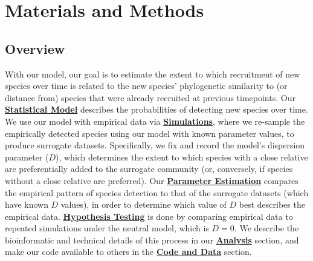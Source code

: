 \documentclass{article}
\begin{document}
\section{Materials and Methods}

\subsection{Overview} \label{sec:overview}
With our model, our goal is to estimate the extent to which recruitment of new species over time is related to the new species' phylogenetic similarity to (or distance from) species that were already recruited at previous timepoints. Our \hyperref[sec:statisticalModel]{\textbf{Statistical Model}} describes the probabilities of detecting new species over time. We use our model with empirical data via \hyperref[sec:simulations]{\textbf{Simulations}}, where we re-sample the empirically detected species using our model with known parameter values, to produce surrogate datasets. Specifically, we fix and record the model’s dispersion parameter (\(D\)), which determines the extent to which species with a close relative are preferentially added to the surrogate community (or, conversely, if species without a close relative are preferred). Our \hyperref[sec:parameterEstimation]{\textbf{Parameter Estimation}} compares the empirical pattern of species detection to that of the surrogate datasets (which have known \(D\) values), in order to determine which value of \(D\) best describes the empirical data. \hyperref[sec:hypothesisTesting]{\textbf{Hypothesis Testing}} is done by comparing empirical data to repeated simulations under the neutral model, which is \(D=0\). We describe the bioinformatic and technical details of this process in our \hyperref[sec:analysis]{\textbf{Analysis}} section, and make our code available to others in the \hyperref[sec:codeAndData]{\textbf{Code and Data}} section.
\end{document}
